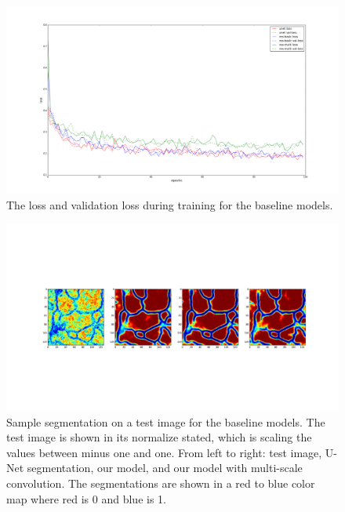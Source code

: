\begin{figure}[h!]
	\centering
		\includegraphics[width=1.0\textwidth]{figures/baseline_loss.png}
	\caption{The loss and validation loss during training for the baseline models.}
	\label{f:baseline-loss}
\end{figure}
\begin{figure}[h!]
	\centering
		\includegraphics[width=1.0\textwidth]{figures/baseline.png}
	\caption{Sample segmentation on a test image for the baseline models. The test image is shown in its normalize stated, which is scaling the values between minus one and one. From left to right: test image, U-Net segmentation, our model, and our model with multi-scale convolution. The segmentations are shown in a red to blue color map where red is 0 and blue is 1.}
	\label{f:baseline}
\end{figure}

